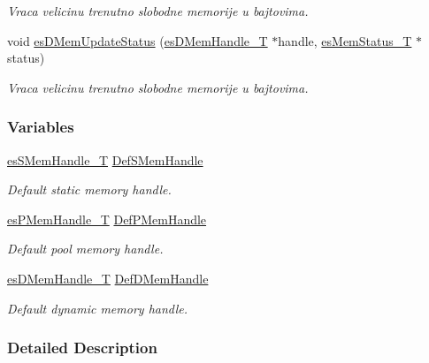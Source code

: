 \begin{DoxyCompactItemize}
\begin{DoxyCompactList}\small\item\em Vraca velicinu trenutno slobodne memorije u bajtovima. \end{DoxyCompactList}\item 
void \hyperlink{group__mem__impl_ga22ab58d97d2519dccf91220f029ac87f}{es\-D\-Mem\-Update\-Status} (\hyperlink{group__mem__intf_gacaaf771b18b3da8fa3b67a466390080e}{es\-D\-Mem\-Handle\-\_\-\-T} $\ast$handle, \hyperlink{group__mem__intf_ga0eb568b68247d93e2db804a681de0e9e}{es\-Mem\-Status\-\_\-\-T} $\ast$status)
\begin{DoxyCompactList}\small\item\em Vraca velicinu trenutno slobodne memorije u bajtovima. \end{DoxyCompactList}\end{DoxyCompactItemize}
\subsubsection*{Variables}
\begin{DoxyCompactItemize}
\item 
\hyperlink{group__mem__intf_gabf19a317cc22713cfb45ae1e43d34d7e}{es\-S\-Mem\-Handle\-\_\-\-T} \hyperlink{group__mem__impl_ga59214c7e13470c5e76c7b59c4f084b1c}{Def\-S\-Mem\-Handle}
\begin{DoxyCompactList}\small\item\em Default static memory handle. \end{DoxyCompactList}\item 
\hyperlink{group__mem__intf_gaf82f01d26c4f6bc9a2b672a673b09ce2}{es\-P\-Mem\-Handle\-\_\-\-T} \hyperlink{group__mem__impl_gafb0dc701e9679157a617a091843bcd7f}{Def\-P\-Mem\-Handle}
\begin{DoxyCompactList}\small\item\em Default pool memory handle. \end{DoxyCompactList}\item 
\hyperlink{group__mem__intf_gacaaf771b18b3da8fa3b67a466390080e}{es\-D\-Mem\-Handle\-\_\-\-T} \hyperlink{group__mem__impl_gae2d3f8ca3b99ba0a5b9d9518a7bc280b}{Def\-D\-Mem\-Handle}
\begin{DoxyCompactList}\small\item\em Default dynamic memory handle. \end{DoxyCompactList}\end{DoxyCompactItemize}


\subsubsection{Detailed Description}


